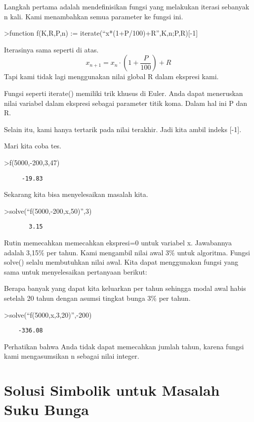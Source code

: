 \documentclass[
]{book}
\begin{document}
Langkah pertama adalah mendefinisikan fungsi yang melakukan iterasi sebanyak n kali. Kami menambahkan semua parameter ke fungsi ini.

\textgreater function f(K,R,P,n) := iterate(``x*(1+P/100)+R'',K,n;P,R){[}-1{]}

Iterasinya sama seperti di atas. \[x_{n+1} = x_n \cdot \left(1+ \frac{P}{100}\right) + R\] Tapi kami tidak lagi menggunakan nilai global R dalam ekspresi kami.

Fungsi seperti iterate() memiliki trik khusus di Euler. Anda dapat meneruskan nilai variabel dalam ekspresi sebagai parameter titik koma. Dalam hal ini P dan R.

Selain itu, kami hanya tertarik pada nilai terakhir. Jadi kita ambil indeks {[}-1{]}.

Mari kita coba tes.

\textgreater f(5000,-200,3,47)

\begin{verbatim}
     -19.83 
\end{verbatim}

Sekarang kita bisa menyelesaikan masalah kita.

\textgreater solve(``f(5000,-200,x,50)'',3)

\begin{verbatim}
       3.15 
\end{verbatim}

Rutin memecahkan memecahkan ekspresi=0 untuk variabel x. Jawabannya adalah 3,15\% per tahun. Kami mengambil nilai awal 3\% untuk algoritma. Fungsi solve() selalu membutuhkan nilai awal. Kita dapat menggunakan fungsi yang sama untuk menyelesaikan pertanyaan berikut:

Berapa banyak yang dapat kita keluarkan per tahun sehingga modal awal habis setelah 20 tahun dengan asumsi tingkat bunga 3\% per tahun.

\textgreater solve(``f(5000,x,3,20)'',-200)

\begin{verbatim}
    -336.08 
\end{verbatim}

Perhatikan bahwa Anda tidak dapat memecahkan jumlah tahun, karena fungsi kami mengasumsikan n sebagai nilai integer.

\section{Solusi Simbolik untuk Masalah Suku Bunga}\label{solusi-simbolik-untuk-masalah-suku-bunga}
\end{document}

